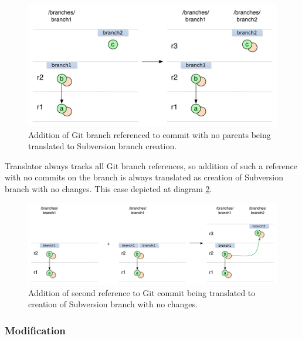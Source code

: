 \begin{figure}[!h]
\centering
\renewcommand{\figurename}{Diagram}
\includegraphics[width=\linewidth]{img/diagrams/branch_creation_no_history_git_to_svn.pdf}
\caption{Addition of Git branch referenced to commit with no parents being translated to Subversion branch creation.}
\label{branch_creation_no_history_git_to_svn}
\end{figure}

\clearpage

Translator always tracks all Git branch references, so addition of such a reference with no commits on the branch is always translated as creation of Subversion branch with no changes. This case depicted at diagram \ref{svn_no_change_branch_creation_git_to_svn}.

\begin{figure}[!h]
\centering
\renewcommand{\figurename}{Diagram}
\includegraphics[width=\linewidth]{img/diagrams/svn_no_change_branch_creation_git_to_svn.pdf}
\caption{Addition of second reference to Git commit being translated to creation of Subversion branch with no changes.}
\label{svn_no_change_branch_creation_git_to_svn}
\end{figure}

\clearpage
\subsubsection{Modification}

